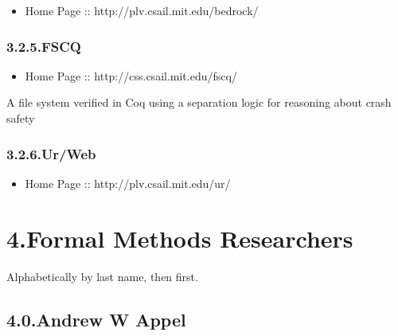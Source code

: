 \documentclass[12pt,twoside]{article}
\begin{document}
\begin{itemize}[noitemsep,topsep=\mdcompacttopsep]%

\item{}Home Page :: http://plv.csail.mit.edu/bedrock/%
\end{itemize}%

\subsubsection{3.2.5.\hspace*{0.5em}FSCQ}\label{sec-fscq}%

\begin{itemize}[noitemsep,topsep=\mdcompacttopsep]%

\item{}Home Page :: http://css.csail.mit.edu/fscq/%
\end{itemize}%

\noindent{}A file system verified in Coq using a separation logic for reasoning about crash safety%

\subsubsection{3.2.6.\hspace*{0.5em}Ur/Web}\label{sec-urweb}%

\begin{itemize}[noitemsep,topsep=\mdcompacttopsep]%

\item{}Home Page :: http://plv.csail.mit.edu/ur/%
\end{itemize}%

\section{4.\hspace*{0.5em}Formal Methods Researchers}\label{sec-formal-methods-researchers}%

\noindent{}Alphabetically by last name, then first.%

\subsection{4.0.\hspace*{0.5em}Andrew W Appel}\label{sec-andrew-w-appel}%
\end{document}
